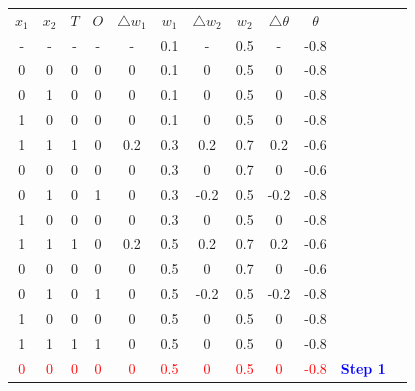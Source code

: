 \documentclass{book}
\begin{document}
\begin{center}
    \begin{tabular}{|c|c|c|c|c|c|c|c|c|c|c|c }
        \cline{1-10}
        \rowcolor{lightblue}
        \textbf{\(x_1\)} & \textbf{\(x_2\)} & \textbf{\(T\)} & \textbf{\(O\)} & \textbf{\(\triangle w_1\)} & \textbf{\(w_1\)} & \textbf{\(\triangle w_2\)} & \textbf{\(w_2\)} & \textbf{\(\triangle \theta\)} & \textbf{\(\theta\)} & \cellcolor{white}{}\\
        \cline{1-10}
        - & - & - & - & - & 0.1 & - & 0.5 & - & -0.8 & \\
        \cline{1-10}
        0 & 0 & 0 & 0 & 0 & 0.1 & 0 & 0.5 & 0 & -0.8 & \\
        \cline{1-10}
        0 & 1 & 0 & 0 & 0 & 0.1 & 0 & 0.5 & 0 & -0.8 & \\
        \cline{1-10}
        1 & 0 & 0 & 0 & 0 & 0.1 & 0 & 0.5 & 0 & -0.8 & \\
        \cline{1-10}
        \rowcolor{lightyellow}
        1 & 1 & 1 & 0 & 0.2 & 0.3 & 0.2 & 0.7 & 0.2 & -0.6 & \cellcolor{white}{} \\
        \cline{1-10}
        0 & 0 & 0 & 0 & 0 & 0.3 & 0 & 0.7 & 0 & -0.6 & \\
        \cline{1-10}
        \rowcolor{lightyellow}
        0 & 1 & 0 & 1 & 0 & 0.3 & -0.2 & 0.5 & -0.2 & -0.8 & \cellcolor{white}{} \\
        \cline{1-10}
        1 & 0 & 0 & 0 & 0 & 0.3 & 0 & 0.5 & 0 & -0.8 & \\
        \cline{1-10}
        \rowcolor{lightyellow}
        1 & 1 & 1 & 0 & 0.2 & 0.5 & 0.2 & 0.7 & 0.2 & -0.6 & \cellcolor{white}{}\\
        \cline{1-10}
        0 & 0 & 0 & 0 & 0 & 0.5 & 0 & 0.7 & 0 & -0.6 & \\
        \cline{1-10}
        \rowcolor{lightyellow}
        0 & 1 & 0 & 1 & 0 & 0.5 & -0.2 & 0.5 & -0.2 & -0.8 & \cellcolor{white}{} \\
        \cline{1-10}
        1 & 0 & 0 & 0 & 0 & 0.5 & 0 & 0.5 & 0 & -0.8 & \\
        \cline{1-10}
        1 & 1 & 1 & 1 & 0 & 0.5 & 0 & 0.5 & 0 & -0.8 & \\
        \cline{1-10}
        \textcolor{red}{0} & \textcolor{red}{0} & \textcolor{red}{0} & \textcolor{red}{0} & \textcolor{red}{0} & \textcolor{red}{0.5} & \textcolor{red}{0} & \textcolor{red}{0.5} & \textcolor{red}{0} & \textcolor{red}{-0.8} & \textcolor{blue}{\textbf{Step 1}}\\
        \cline{1-10}

\end{tabular}
\end{center}
\end{document}
